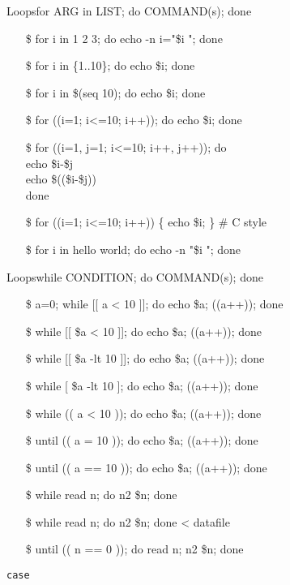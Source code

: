 \begin{frame}{Loops}{\ttfamily for ARG in LIST; do COMMAND(s); done}\small\ttfamily
\begin{itemize}
\item[\$] for i in 1 2 3; do echo -n i="\$i "; done
\item[\$] for i in \{1..10\}; do echo \$i; done
\item[\$] for i in \$(seq 10); do echo \$i; done
\item[\$] for ((i=1; i<=10; i++)); do echo \$i; done
\item[\$] for ((i=1, j=1; i<=10; i++, j++)); do\\
  \quad{}echo \$i-\$j \Bad\\
  \quad{}echo \$((\$i-\$j)) \Good\\
  done
\item[\$] for ((i=1; i<=10; i++)) \{ echo \$i; \} \# C style
\item[\$] for i in hello world; do echo -n "\$i "; done
\end{itemize}
\end{frame}

\begin{frame}{Loops}{\ttfamily while CONDITION; do COMMAND(s); done}\small\ttfamily
\begin{itemize}
\item[\$] a=0; while [[ a < 10 ]]; do echo \$a; ((a++)); done \Bad
\item[\$] while [[ \$a < 10 ]]; do echo \$a; ((a++)); done \Bad
\item[\$] while [[ \$a -lt 10 ]]; do echo \$a; ((a++)); done \correct
\item[\$] while [ \$a -lt 10 ]; do echo \$a; ((a++)); done \correct
\item[\$] while (( a < 10 )); do echo \$a; ((a++)); done \correct
\item[\$] until (( a = 10 )); do echo \$a; ((a++)); done \Bad
\item[\$] until (( a == 10 )); do echo \$a; ((a++)); done \correct
\item[\$] while read n; do n2 \$n; done
\item[\$] while read n; do n2 \$n; done < datafile
\item[\$] until (( n == 0 )); do read n; n2 \$n; done
\end{itemize}
\end{frame}

\begin{frame}{\texttt{case}}
  \begin{center}
  \end{center}
\end{frame}

